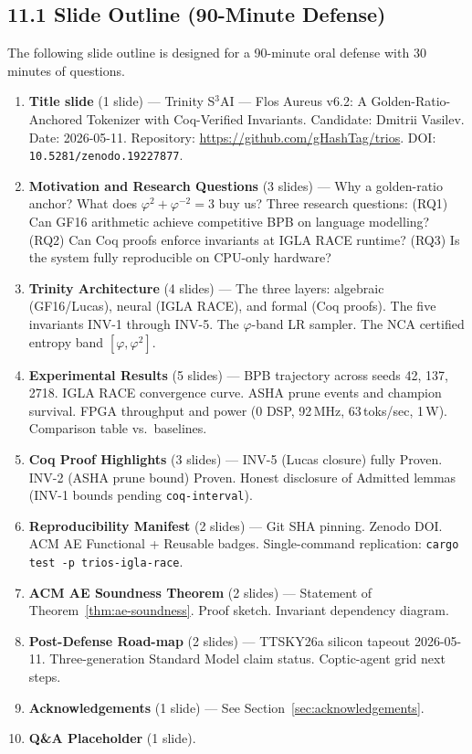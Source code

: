 \subsection{11.1 Slide Outline (90-Minute Defense)}\label{sec:slides}

The following slide outline is designed for a 90-minute oral defense
with 30 minutes of questions.

\begin{enumerate}
\item \textbf{Title slide} (1 slide) — Trinity S${}^3$AI — Flos Aureus
  v6.2: A Golden-Ratio-Anchored Tokenizer with Coq-Verified Invariants.
  Candidate: Dmitrii Vasilev.  Date: 2026-05-11.  Repository:
  \url{https://github.com/gHashTag/trios}.  DOI:
  \texttt{10.5281/zenodo.19227877}.

\item \textbf{Motivation and Research Questions} (3 slides) ---
  Why a golden-ratio anchor?  What does $\varphi^2 + \varphi^{-2} = 3$
  buy us?  Three research questions: (RQ1) Can GF16 arithmetic achieve
  competitive BPB on language modelling? (RQ2) Can Coq proofs enforce
  invariants at IGLA RACE runtime? (RQ3) Is the system fully
  reproducible on CPU-only hardware?

\item \textbf{Trinity Architecture} (4 slides) --- The three layers:
  algebraic (GF16/Lucas), neural (IGLA RACE), and formal (Coq proofs).
  The five invariants INV-1 through INV-5.  The $\varphi$-band LR
  sampler.  The NCA certified entropy band $[\varphi, \varphi^2]$.

\item \textbf{Experimental Results} (5 slides) --- BPB trajectory
  across seeds 42, 137, 2718.  IGLA RACE convergence curve.  ASHA
  prune events and champion survival.  FPGA throughput and power (0 DSP,
  92\,MHz, 63\,toks/sec, 1\,W).  Comparison table vs.\ baselines.

\item \textbf{Coq Proof Highlights} (3 slides) ---
  INV-5 (Lucas closure) fully Proven.  INV-2 (ASHA prune bound)
  Proven.  Honest disclosure of Admitted lemmas (INV-1 bounds pending
  \texttt{coq-interval}).

\item \textbf{Reproducibility Manifest} (2 slides) ---
  Git SHA pinning.  Zenodo DOI.  ACM AE Functional + Reusable badges.
  Single-command replication: \verb|cargo test -p trios-igla-race|.

\item \textbf{ACM AE Soundness Theorem} (2 slides) ---
  Statement of Theorem~\ref{thm:ae-soundness}.  Proof sketch.
  Invariant dependency diagram.

\item \textbf{Post-Defense Road-map} (2 slides) ---
  TTSKY26a silicon tapeout 2026-05-11.  Three-generation Standard Model
  claim status.  Coptic-agent grid next steps.

\item \textbf{Acknowledgements} (1 slide) --- See
  Section~\ref{sec:acknowledgements}.

\item \textbf{Q\&A Placeholder} (1 slide).
\end{enumerate}

